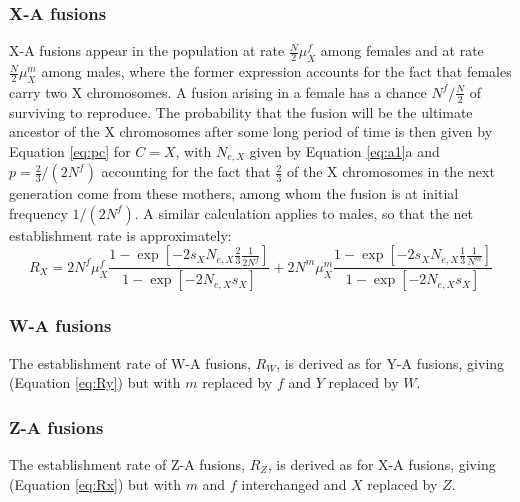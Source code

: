 \subsubsection{X-A fusions}

X-A fusions appear in the population at rate $\frac{N}{\text{2}}\mu^f_X$ among females and at rate $\frac{N}{\text{2}}\mu^m_X$ among males, where the former expression accounts for the fact that females carry two X chromosomes. A fusion arising in a female has a chance $N^f/\frac{N}{\text{2}}$ of surviving to reproduce. The probability that the fusion will be the ultimate ancestor of the X chromosomes after some long period of time is then given by Equation \ref{eq:pc} for $C = X$, with $N_{e,X}$ given by Equation \ref{eq:a1}a and $p=\frac{\text{2}}{\text{3}}/(\text{2}N^f)$ accounting for the fact that $\frac{\text{2}}{\text{3}}$ of the X chromosomes in the next generation come from these mothers, among whom the fusion is at initial frequency $\text{1}/(\text{2}N^f)$. A similar calculation applies to males, so that the net establishment rate is approximately:
\begin{equation}\label{eq:Rx}
R_X = \text{2}N^f\mu^f_X 
\frac{\text{1}- \exp[-\text{2}s_X N_{e,X}  \frac{\text{2}}{\text{3}} \frac{\text{1}}{\text{2}N^f} ]}{\text{1} - \exp[-\text{2}N_{e,X} s_X]} 
+ \text{2}N^m\mu^m_X \frac{\text{1}- \exp[-\text{2}s_X N_{e,X}  \frac{\text{1}}{\text{3}} \frac{\text{1}}{N^m}]}{\text{1} - \exp[-\text{2}N_{e,X} s_X]}
\end{equation}

\subsubsection{W-A fusions}
The establishment rate of W-A fusions, $R_W$, is derived as for Y-A fusions, giving (Equation \ref{eq:Ry}) but with $m$ replaced by $f$ and $Y$ replaced by $W$.

\subsubsection{Z-A fusions}
The establishment rate of Z-A fusions, $R_Z$, is derived as for X-A fusions, giving (Equation \ref{eq:Rx}) but with $m$ and $f$ interchanged and $X$ replaced by $Z$.

